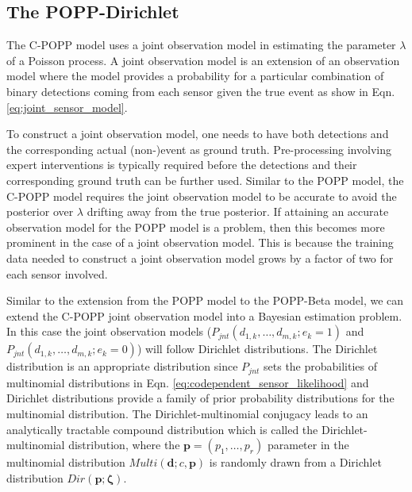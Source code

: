 
\subsection{The POPP-Dirichlet}
\label{subsec:popd}

The C-POPP model uses a joint observation model in estimating the parameter $\lambda$ of a Poisson process. A joint observation model is an extension of an observation model where the model provides a probability for a particular combination of binary detections coming from each sensor given the true event as show in Eqn. \ref{eq:joint_sensor_model}.

To construct a joint observation model, one needs to have both detections and the corresponding actual (non-)event as ground truth. Pre-processing involving expert interventions is typically required before the detections and their corresponding ground truth can be further used. Similar to the POPP model, the C-POPP model requires the joint observation model to be accurate to avoid the posterior over $\lambda$ drifting away from the true posterior. If attaining an accurate observation model for the POPP model is a problem, then this becomes more prominent in the case of a joint observation model. This is because the training data needed to construct a joint observation model grows by a factor of two for each sensor involved.       

Similar to the extension from the POPP model to the POPP-Beta model, we can extend the C-POPP joint observation model into a Bayesian estimation problem. In this case the joint observation models ($P_{jnt}(d_{1,k}, \ldots, d_{m,k} ; e_k = 1)$ and $P_{jnt}(d_{1,k}, \ldots, d_{m,k} ; e_k = 0)$) will follow Dirichlet distributions. The Dirichlet distribution is an appropriate distribution since $P_{jnt}$ sets the probabilities of multinomial distributions in Eqn. \ref{eq:codependent_sensor_likelihood} and Dirichlet distributions provide a family of prior probability distributions for the multinomial distribution. The Dirichlet-multinomial conjugacy leads to an analytically tractable compound distribution which is called the Dirichlet-multinomial distribution, where the $\mathbf{p} = (p_1, \ldots, p_r)$ parameter in the multinomial distribution $Multi(\mathbf{d} ; c, \mathbf{p})$ is randomly drawn from a Dirichlet distribution $Dir(\mathbf{p} ; \mathbf{\zeta})$. 

